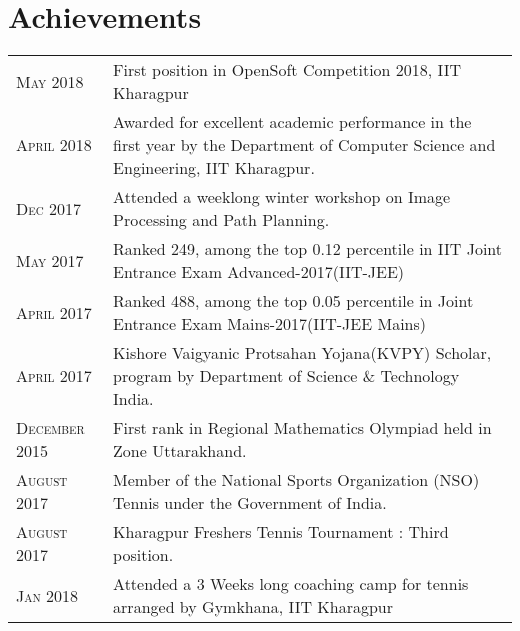 \documentclass[a4paper,10pt]{extarticle} %
\begin{document}
\vspace{-0.3cm}
\section{\textcolor{primary}{Achievements}}

\begin{tabularx}{\linewidth}{ l | X }

\textsc{May 2018} & First position in OpenSoft Competition 2018, IIT Kharagpur \\
\textsc{April 2018} & Awarded for excellent academic performance in the first year by the Department of Computer Science and Engineering, IIT Kharagpur. \\
\textsc{Dec 2017} & Attended a weeklong winter workshop on Image Processing and Path Planning. \\
\textsc{May 2017} & Ranked 249, among the top 0.12 percentile in IIT Joint Entrance Exam Advanced-2017(IIT-JEE) \\
\textsc{April 2017} & Ranked 488, among the top 0.05 percentile in Joint Entrance Exam Mains-2017(IIT-JEE Mains) \\
\textsc{April 2017} & Kishore Vaigyanic Protsahan Yojana(KVPY) Scholar, program by Department of Science \& Technology India.\\
\textsc{December 2015} & First rank in Regional Mathematics Olympiad held in Zone Uttarakhand. \\
\textsc{August 2017} & Member of the National Sports Organization (NSO) Tennis under the Government of India. \\
\textsc{August 2017} & Kharagpur Freshers Tennis Tournament : Third position. \\
\textsc{Jan 2018} & Attended a 3 Weeks long coaching camp for tennis arranged by Gymkhana, IIT Kharagpur
\end{tabularx}

\end{document}
